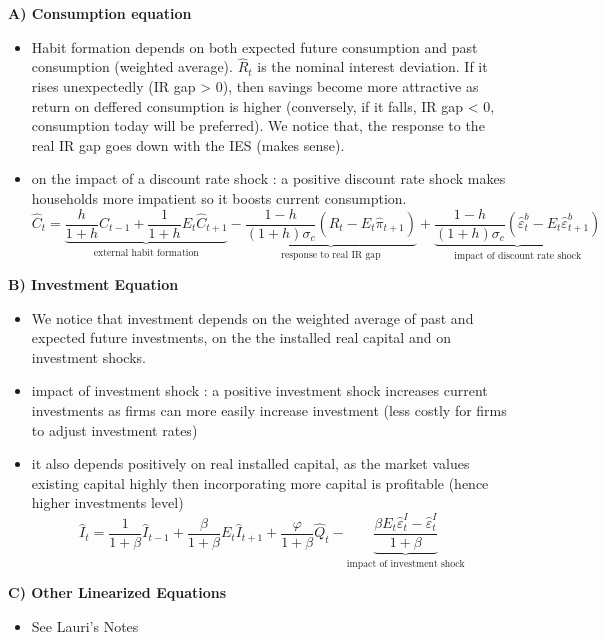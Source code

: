 \documentclass{article}
\begin{document}
\textbf{A) Consumption equation}
\begin{itemize}
    \item Habit formation depends on both expected future consumption and past consumption (weighted average). $\hat{R}_t$ is the nominal interest deviation. If it rises unexpectedly (IR gap > 0), then savings become more attractive as return on deffered consumption is higher (conversely, if it falls, IR gap < 0, consumption today will be preferred). We notice that, the response to the real IR gap goes down with the IES (makes sense). 
    \item on the impact of a discount rate shock : a positive discount rate shock makes households more impatient so it boosts current consumption. 
    \begin{equation}
        \hat{C}_t = \underbrace{\frac{h}{1+h} \hat{C}_{t-1} + \frac{1}{1+h} E_t \hat{C}_{t+1}}_{\text{external habit formation}} - \underbrace{\frac{1-h}{(1+h)\sigma_c} \left( \hat{R}_t - E_t \hat{\pi}_{t+1} \right)}_{\text{response to real IR gap}} + \underbrace{\frac{1-h}{(1+h)\sigma_c} \left( \hat{\varepsilon}_t^b - E_t \hat{\varepsilon}_{t+1}^b \right)}_{\text{impact of discount rate shock}}
    \end{equation}
\end{itemize}

\textbf{B) Investment Equation}
\begin{itemize}
    \item We notice that investment depends on the weighted average of past and expected future investments, on the the installed real capital and on investment shocks. 
    \item impact of investment shock : a positive investment shock increases current investments as firms can more easily increase investment (less costly for firms to adjust investment rates)
    \item it also depends positively on real installed capital, as the market values existing capital highly then incorporating more capital is profitable (hence higher investments level)
    \begin{equation}
       \hat{I}_t = \frac{1}{1+\beta} \hat{I}_{t-1} + \frac{\beta}{1+\beta} E_t \hat{I}_{t+1} + \frac{\varphi}{1+\beta} \hat{Q}_t - \underbrace{\frac{\beta E_t \hat{\varepsilon}_t^I - \hat{\varepsilon}_t^I}{1+\beta}}_{\text{impact of investment shock}} 
    \end{equation}
\end{itemize}

\textbf{C) Other Linearized Equations}
\begin{itemize}
    \item See Lauri's Notes
\end{itemize}
\end{document}
